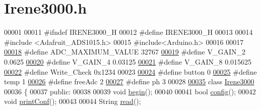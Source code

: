 \hypertarget{_irene3000_8h_source}{}\section{Irene3000.\+h}

\begin{DoxyCode}
00001 
00011 \textcolor{preprocessor}{#ifndef IRENE3000\_H}
00012 \textcolor{preprocessor}{#define IRENE3000\_H}
00013 
00014 \textcolor{preprocessor}{#include <Adafruit\_ADS1015.h>}    
00015 \textcolor{preprocessor}{#include<Arduino.h>}
00016 
00017 
\hyperlink{_irene3000_8h_ae04444a85a37b5dce09107f2ce2b2c80}{00018} \textcolor{preprocessor}{#define ADC\_MAXIMUM\_VALUE     32767}
\hyperlink{_irene3000_8h_a905a3e9dbe2e4aef45dda002f2f6993d}{00019} \textcolor{preprocessor}{#define V\_GAIN\_2 0.0625}
\hyperlink{_irene3000_8h_a9a0ac774ada946f154982546852e8fb6}{00020} \textcolor{preprocessor}{#define V\_GAIN\_4 0.03125}
\hyperlink{_irene3000_8h_ab7ab16df599d3f0ce29e12791a504891}{00021} \textcolor{preprocessor}{#define V\_GAIN\_8 0.015625}
\hyperlink{_irene3000_8h_a9fa3b8fd890fde289060ee254cd273d5}{00022} \textcolor{preprocessor}{#define Write\_Check      0x1234}
00023 
\hyperlink{_irene3000_8h_a37976ee6fe1fb8546bfd6153b83ffa6c}{00024} \textcolor{preprocessor}{#define button 0}
\hyperlink{_irene3000_8h_a5905d48604152cf57aa6bfa087b49173}{00025} \textcolor{preprocessor}{#define temp 1}
\hyperlink{_irene3000_8h_a55497513af255250e464ed76543d46d7}{00026} \textcolor{preprocessor}{#define freeAdc 2}
\hyperlink{_irene3000_8h_af771ceafe0e6524dd8497d4305dfe778}{00027} \textcolor{preprocessor}{#define ph 3}
00028 
\hyperlink{class_irene3000}{00035} \textcolor{keyword}{class }\hyperlink{class_irene3000}{Irene3000}
00036 \{
00037 \textcolor{keyword}{public}:
00038 
00039     \textcolor{keywordtype}{void} \hyperlink{class_irene3000_ad5891806c500ae1007afe52b9e304c2b}{begin}();
00040 
00041     \textcolor{keywordtype}{bool} \hyperlink{class_irene3000_afed5c35e4b23963c157847ef27c11e9c}{config}();
00042     \textcolor{keywordtype}{void} \hyperlink{class_irene3000_a7bc2414100b5e19eacc6630fa34b2654}{printConf}();
00043 
00044     String \hyperlink{class_irene3000_a852a170feea994ea1df01c6b245b5d9a}{read}();

\end{DoxyCode}
